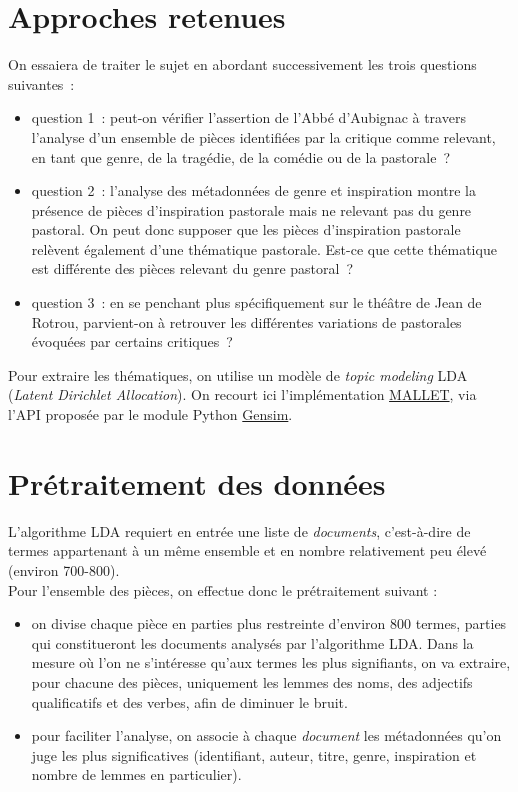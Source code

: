 \documentclass[a4paper,twoside,12pt]{article}
\begin{document}
\section*{Approches retenues}
On essaiera de traiter le sujet en abordant successivement les trois questions suivantes\ :
\begin{itemize}
\item question 1\ : peut-on vérifier l’assertion de l’Abbé d’Aubignac à travers l'analyse d’un ensemble de pièces identifiées par la critique comme relevant, en tant que genre, de la tragédie, de la comédie ou de la pastorale\ ?
\item question 2\ : l’analyse des métadonnées de genre et inspiration montre la présence de pièces d’inspiration pastorale mais ne relevant pas du genre pastoral. On peut donc supposer que les pièces d’inspiration pastorale relèvent également d’une thématique pastorale. Est-ce que cette thématique est différente des pièces relevant du genre pastoral\ ?
\item question 3\ : en se penchant plus spécifiquement sur le théâtre de Jean de Rotrou, parvient-on à retrouver les différentes variations de pastorales évoquées par certains critiques\ ?
\end{itemize}

Pour extraire les thématiques, on utilise un modèle de \textit{topic modeling} LDA (\textit{Latent Dirichlet Allocation}). On recourt ici l'implémentation \href{http://mallet.cs.umass.edu/}{MALLET}, via l'API proposée par le module Python \href{https://radimrehurek.com/gensim/models/wrappers/ldamallet.html}{Gensim}.

\section*{Prétraitement des données}
L'algorithme LDA requiert en entrée une liste de \textit{documents}, c'est-à-dire de termes appartenant à un même ensemble et en nombre relativement peu élevé (environ 700-800).\\
Pour l’ensemble des pièces, on effectue donc le prétraitement suivant :
\begin{itemize}
\item on divise chaque pièce en parties plus restreinte d’environ 800 termes, parties qui constitueront les documents analysés par l’algorithme LDA. Dans la mesure où l’on ne s’intéresse qu’aux termes les plus signifiants, on va extraire, pour chacune des pièces, uniquement les lemmes des noms, des adjectifs qualificatifs et des verbes, afin de diminuer le bruit.
\item pour faciliter l'analyse, on associe à chaque \textit{document} les métadonnées qu'on juge les plus significatives (identifiant, auteur, titre, genre, inspiration et nombre de lemmes en particulier).
\end{itemize}
\end{document}
